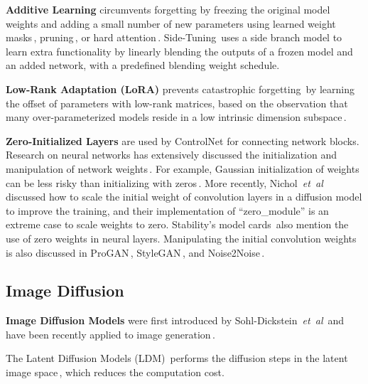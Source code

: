 	\textbf{Additive Learning} circumvents forgetting by freezing the original model weights and adding a small number of new parameters using learned weight
	masks\,\cite{mallya2018piggyback,rosenfeld2018incremental},
	pruning\,\cite{mallya2018packnet}, or hard
	attention\,\cite{serra2018overcoming}.
	Side-Tuning\,\cite{zhang2020side} uses a side branch model to learn extra functionality by linearly blending the outputs of a frozen model and an added network, with a predefined blending weight schedule.

	\textbf{Low-Rank Adaptation (LoRA)} prevents catastrophic
	forgetting\,\cite{hu2021lora} by learning the offset of parameters with low-rank matrices, based on the observation that many over-parameterized models reside in a low intrinsic dimension subspace\,\cite{aghajanyan2021intrinsic,li2018measuring}.

	\textbf{Zero-Initialized Layers} are used by ControlNet for connecting network blocks. Research on neural networks has extensively discussed the initialization and manipulation of network
	weights\,\cite{karras2017progressive,karras2019style,LeCun2015,lecun1998gradient,lehtinen2018noise2noise,Rumelhart1986,sdd,zhao2021zero}.
	For example, Gaussian initialization of weights can be less risky than initializing with zeros\,\cite{arfin2020weight}.  More recently,
	Nichol~\emph{et~al}\onedot~\cite{nichol2021improved} discussed how to scale the initial weight of convolution layers in a diffusion model to improve the training, and their implementation of ``zero\_module'' is an extreme case to scale weights to zero.  Stability's model
	cards\,\cite{sdd} also mention the use of zero weights in neural layers.  Manipulating the initial convolution weights is also discussed in ProGAN\,\cite{karras2017progressive},
	StyleGAN\,\cite{karras2019style},
	and Noise2Noise\,\cite{lehtinen2018noise2noise}.

	\subsection{Image Diffusion}

	\textbf{Image Diffusion Models} were first introduced by
	Sohl-Dickstein~\emph{et~al}\onedot\,\cite{sohl2015deep} and have been recently applied to image
	generation\,\cite{dhariwal2021diffusion,kingma2021variational}.

	The Latent Diffusion Models (LDM)\,\cite{rombach2021highresolution}
	performs the diffusion steps in the latent image
	space\,\cite{esser2021taming}, which reduces the computation cost.

